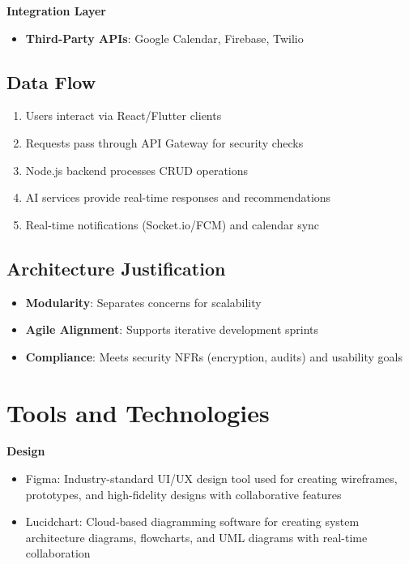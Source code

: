 \textbf{Integration Layer}
\begin{itemize}
    \item \textbf{Third-Party APIs}: Google Calendar, Firebase, Twilio
\end{itemize}

\subsection{Data Flow}
\begin{enumerate}
    \item Users interact via React/Flutter clients
    \item Requests pass through API Gateway for security checks
    \item Node.js backend processes CRUD operations
    \item AI services provide real-time responses and recommendations
    \item Real-time notifications (Socket.io/FCM) and calendar sync
\end{enumerate}

\subsection{Architecture Justification}
\begin{itemize}
    \item \textbf{Modularity}: Separates concerns for scalability
    \item \textbf{Agile Alignment}: Supports iterative development sprints
    \item \textbf{Compliance}: Meets security NFRs (encryption, audits) and usability goals
\end{itemize}

\section{Tools and Technologies}
\label{sec:tools_tech}

\textbf{Design}
\begin{itemize}
    \item Figma: Industry-standard UI/UX design tool used for creating wireframes, prototypes, and high-fidelity designs with collaborative features
    \item Lucidchart: Cloud-based diagramming software for creating system architecture diagrams, flowcharts, and UML diagrams with real-time collaboration
\end{itemize}

